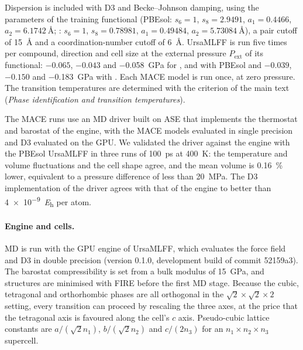 Dispersion is included with D3 and Becke--Johnson damping, using the parameters of the training
functional (PBEsol: $s_6 = 1$, $s_8 = 2.9491$, $a_1 = 0.4466$, $a_2 = \SI{6.1742}{\angstrom}$;
\rSCAN{}: $s_6 = 1$, $s_8 = 0.78981$, $a_1 = 0.49484$, $a_2 = \SI{5.73084}{\angstrom}$), a pair cutoff
of \SI{15}{\angstrom} and a coordination-number cutoff of \SI{6}{\angstrom}. UrsaMLFF is run five times
per compound, direction and cell size at the external pressure $P_\mathrm{ext}$ of its functional:
$-0.065$, $-0.043$ and \SI{-0.058}{GPa} for \CsSnI{}, \MASnI{} and \FASnI{} with PBEsol and $-0.039$,
$-0.150$ and \SI{-0.183}{GPa} with \rSCAN{}. Each MACE model is run once, at zero
pressure. The transition temperatures are determined with the criterion of the main text
(\emph{Phase identification and transition temperatures}).

The MACE runs use an MD driver built on ASE\cite{Larsen2017ASE} that implements the thermostat and
barostat of the engine, with the MACE models evaluated in single precision and D3 evaluated on the
GPU. We validated the driver against the engine with the PBEsol UrsaMLFF in three runs of
\SI{100}{ps} at \SI{400}{K}: the temperature and volume fluctuations and the cell shape agree, and the
mean volume is \SI{0.16}{\percent} lower, equivalent to a pressure difference of less than
\SI{20}{MPa}. The D3 implementation of the driver agrees with that of the engine to better than
\SI{4e-9}{\hartree} per atom.

\paragraph{Engine and cells.} MD is run with the GPU engine of UrsaMLFF, which evaluates the force field and D3 in
double precision (version 0.1.0, development build of commit 52159a3). The barostat compressibility is set from a bulk
modulus of \SI{15}{GPa}, and structures are minimised with FIRE\cite{Bitzek2006PRL} before the first MD stage. Because
the cubic, tetragonal and orthorhombic phases are all orthogonal in the $\sqrt{2}\times\sqrt{2}\times2$ setting, every
transition can proceed by rescaling the three axes, at the price that the tetragonal axis is favoured along the cell's
$c$ axis. Pseudo-cubic lattice constants are $a/(\sqrt{2}n_1)$, $b/(\sqrt{2}n_2)$ and $c/(2n_3)$ for an
$n_1\times n_2\times n_3$ supercell.

